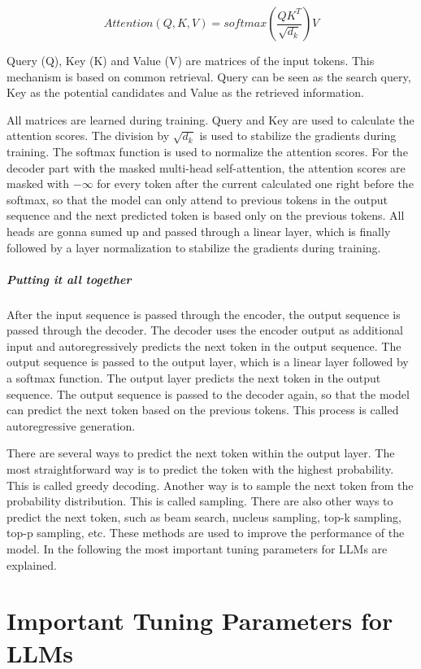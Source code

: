 $$Attention(Q,K, V) = softmax(\frac{QK^T}{\sqrt{d_k}})V$$

Query (Q), Key (K) and Value (V) are matrices of the input tokens. This mechanism is based on common retrieval. Query can be seen as the search query, Key as the potential candidates and Value as the retrieved information.

All matrices are learned during training. Query and Key are used to calculate the attention scores. The division by $\sqrt{d_k}$ is used to stabilize the gradients during training. The softmax function is used to normalize the attention scores. For the decoder part with the masked multi-head self-attention, the attention scores are masked with $-\infty$ for every token after the current calculated one right before the softmax, so that the model can only attend to previous tokens in the output sequence and the next predicted token is based only on the previous tokens. All heads are gonna sumed up and passed through a linear layer, which is finally followed by a layer normalization to stabilize the gradients during training. 

\subparagraph{Putting it all together}
After the input sequence is passed through the encoder, the output sequence is passed through the decoder. The decoder uses the encoder output as additional input and autoregressively predicts the next token in the output sequence. The output sequence is passed to the output layer, which is a linear layer followed by a softmax function. The output layer predicts the next token in the output sequence. The output sequence is passed to the decoder again, so that the model can predict the next token based on the previous tokens. This process is called autoregressive generation.

There are several ways to predict the next token within the output layer. The most straightforward way is to predict the token with the highest probability. This is called greedy decoding. Another way is to sample the next token from the probability distribution. This is called sampling. There are also other ways to predict the next token, such as beam search, nucleus sampling, top-k sampling, top-p sampling, etc. These methods are used to improve the performance of the model. In the following the most important tuning parameters for LLMs are explained.

\section{Important Tuning Parameters for LLMs}

